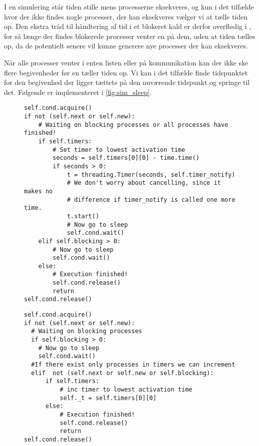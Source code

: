 I en simulering står tiden stille mens processerne  eksekveres, og kun i det tilfælde hvor der ikke findes nogle processer, der kan eksekveres vælger vi at tælle tiden op.  Den ekstra tråd til håndtering af tid i et blokeret kald er derfor overflødig i \des, for så længe der findes blokerede processer venter \sched en på dem, uden at tiden tælles op, da de potentielt senere vil kunne  generere nye processer der kan eksekveres.

Når alle processer venter i enten  listen eller på kommunikation kan der ikke ske flere begivenheder før \sched en tæller tiden op. 
Vi kan i det tilfælde finde tidspunktet for den begivenhed der ligger tættets på den nuværende tidspunkt  og springe til det. Følgende er implementeret i \cref{fig:sim_sleep}.
\begin{figure}[hbtp]
\begin{minipage}[c]{\linewidth}
\begin{lstlisting}[firstnumber=239, label=fig:blocking_sleep, caption=Uddrag af \sched en i \code{Scheduler}]
self.cond.acquire()
if not (self.next or self.new):
    # Waiting on blocking processes or all processes have finished!
    if self.timers:
        # Set timer to lowest activation time
        seconds = self.timers[0][0] - time.time()
        if seconds > 0:
            t = threading.Timer(seconds, self.timer_notify)
            # We don't worry about cancelling, since it makes no 
            # difference if timer_notify is called one more time.
            t.start()
            # Now go to sleep
            self.cond.wait()
    elif self.blocking > 0:
        # Now go to sleep
        self.cond.wait()
    else:
        # Execution finished!
        self.cond.release()
        return
self.cond.release()
\end{lstlisting}
\end{minipage}
\begin{minipage}[c]{\linewidth}
\begin{lstlisting}[firstnumber=158, label=fig:sim_sleep, caption= uddrag af \sched en i \code{Simulation}]
self.cond.acquire()
if not (self.next or self.new):
  # Waiting on blocking processes
  if self.blocking > 0:
    # Now go to sleep
    self.cond.wait()
  #If there exist only processes in timers we can increment
  elif  not (self.next or self.new or self.blocking): 
      if self.timers:
          # inc timer to lowest activation time
          self._t = self.timers[0][0]
      else:
          # Execution finished!
          self.cond.release()
          return
self.cond.release()  
\end{lstlisting}
\end{minipage}
\end{figure}

